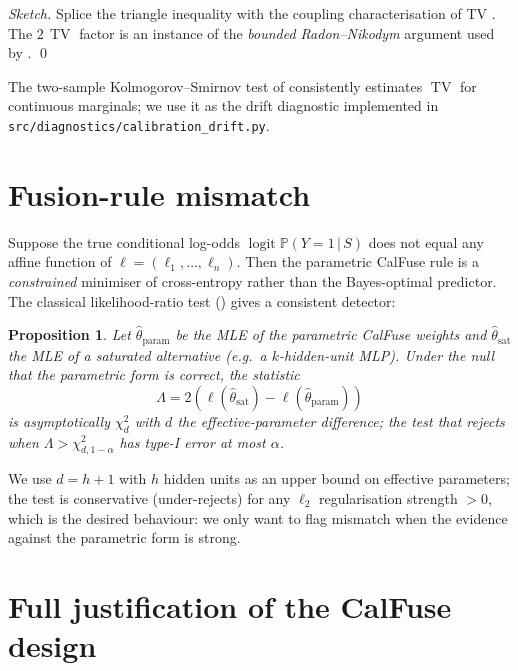 \documentclass[11pt]{article}
\newtheorem{proposition}[theorem]{Proposition}
\theoremstyle{definition}
\theoremstyle{remark}
\newcommand{\pr}{\mathbb{P}}
\newcommand{\logit}{\operatorname{logit}}
\newcommand{\given}{\,\big|\,}
\begin{document}
\begin{proof}[Sketch]
Splice the triangle inequality with the coupling characterisation of TV
\citep{villani2009optimal}. The $2\,\operatorname{TV}$ factor is an instance
of the \emph{bounded Radon--Nikodym} argument used by
\citet{ovadia2019cantrust}. \qed
\end{proof}

The two-sample Kolmogorov--Smirnov test of
\citet{massey1951ksmirnov} consistently estimates $\operatorname{TV}$ for
continuous marginals; we use it as the drift diagnostic implemented in
\texttt{src/diagnostics/calibration\_drift.py}.

\section{Fusion-rule mismatch}

Suppose the true conditional log-odds $\logit \pr(Y=1 \given S)$ does not
equal any affine function of $\ell = (\ell_1, \ldots, \ell_n)$. Then the
parametric CalFuse rule is a \emph{constrained} minimiser of cross-entropy
rather than the Bayes-optimal predictor. The classical likelihood-ratio test
(\citealt{wilks1938ratio}) gives a consistent detector:

\begin{proposition}
Let $\hat{\theta}_{\mathrm{param}}$ be the MLE of the parametric CalFuse
weights and $\hat{\theta}_{\mathrm{sat}}$ the MLE of a saturated alternative
(e.g.\ a $k$-hidden-unit MLP). Under the null that the parametric form is
correct, the statistic
\[
  \Lambda = 2\left( \ell(\hat{\theta}_{\mathrm{sat}}) - \ell(\hat{\theta}_{\mathrm{param}}) \right)
\]
is asymptotically $\chi^2_{d}$ with $d$ the effective-parameter difference;
the test that rejects when $\Lambda > \chi^2_{d, 1-\alpha}$ has type-I
error at most $\alpha$.
\end{proposition}

We use $d = h + 1$ with $h$ hidden units as an upper bound on effective
parameters; the test is conservative (under-rejects) for any $\ell_2$
regularisation strength $> 0$, which is the desired behaviour: we only
want to flag mismatch when the evidence against the parametric form is
strong.

\section{Full justification of the CalFuse design}
\end{document}
